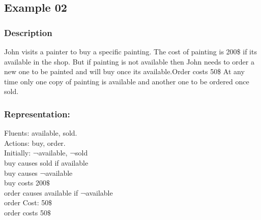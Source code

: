 \documentclass[11pt]{article}
\begin{document}
	\subsection{Example 02}\label{example:ex02}
	\subsubsection{Description}\label{par:p102}
	John visits a painter to buy a specific painting. The cost of painting is 200\$ if its available in the shop. But if painting is not available then John needs to order a new one to be painted and will buy once its available.Order costs 50\$ At any time only one copy of painting is available and another one to be ordered once sold. 
	
	\subsubsection{Representation:}\label{par:p202}
	\indent 
	Fluents: available, sold.\\
	Actions: buy, order.\\
	Initially: ¬available, ¬sold\\
	buy causes sold if available\\
	buy causes ¬available\\
	buy costs 200$\$$ \\
	order causes available if ¬available\\
	order Cost: 50$\$$ \\
	order costs 50$\$$ \\
	
\end{document}

